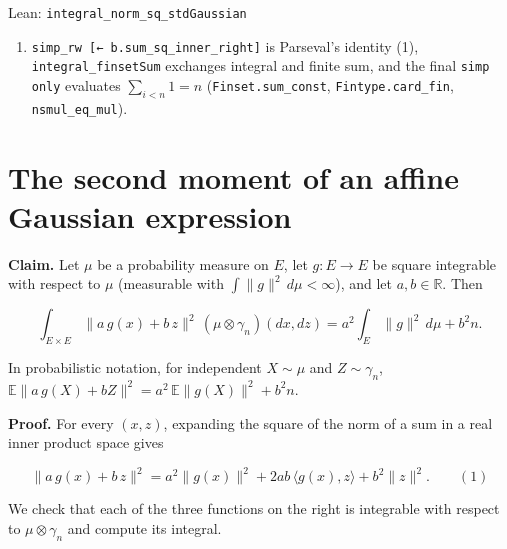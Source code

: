 \documentclass[11pt,a4paper]{article}
\begin{document}
\begin{leanbox}{Lean: \texttt{integral\_\allowbreak{}norm\_\allowbreak{}sq\_\allowbreak{}stdGaussian}}
\begin{enumerate}
\item \texttt{simp\_\allowbreak{}rw [← b.\allowbreak{}sum\_\allowbreak{}sq\_\allowbreak{}inner\_\allowbreak{}right]} is Parseval's identity (1), \texttt{integral\_\allowbreak{}finset\allowbreak{}Sum} exchanges integral and finite sum, and the final \texttt{simp only} evaluates \(\sum_{i<n}1=n\) (\texttt{Finset.\allowbreak{}sum\_\allowbreak{}const}, \texttt{Fintype.\allowbreak{}card\_\allowbreak{}fin}, \texttt{nsmul\_\allowbreak{}eq\_\allowbreak{}mul}).

\end{enumerate}
\end{leanbox}

\section{\texorpdfstring{The second moment of an affine Gaussian expression}{The second moment of an affine Gaussian expression}}


\textbf{Claim.} Let \(\mu\) be a probability measure on \(E\), let \(g:E\to E\) be square integrable with respect to \(\mu\) (measurable with \(\int\|g\|^2\,d\mu<\infty\)), and let \(a,b\in\mathbb R\). Then


\[\int_{E\times E}\|a\,g(x)+b\,z\|^2\,(\mu\otimes\gamma_n)(dx,dz)=a^2\int_E\|g\|^2\,d\mu+b^2n.\]


In probabilistic notation, for independent \(X\sim\mu\) and \(Z\sim\gamma_n\), \(\mathbb E\|a\,g(X)+bZ\|^2=a^2\,\mathbb E\|g(X)\|^2+b^2n\).




\textbf{Proof.} For every \((x,z)\), expanding the square of the norm of a sum in a real inner product space gives


\[\|a\,g(x)+b\,z\|^2=a^2\|g(x)\|^2+2ab\,\langle g(x),z\rangle+b^2\|z\|^2.\qquad(1)\]


We check that each of the three functions on the right is integrable with respect to \(\mu\otimes\gamma_n\) and compute its integral.
\end{document}

